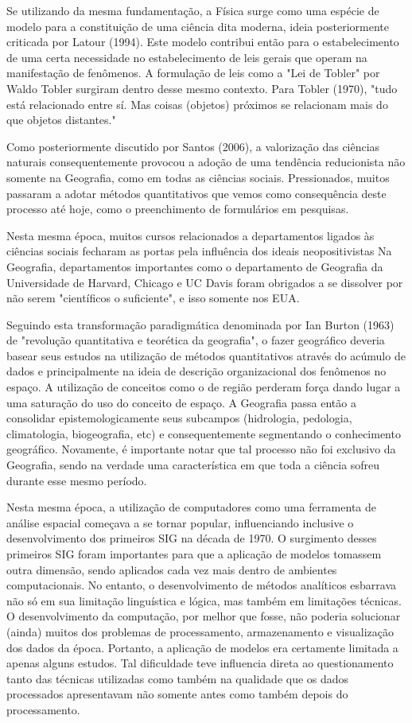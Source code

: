 Se utilizando da mesma fundamentação, a Física surge como uma espécie de modelo para a constituição de uma ciência dita moderna, ideia posteriormente criticada por Latour (1994)\cite{LATOUR}. Este modelo contribui então para o estabelecimento de uma certa necessidade no estabelecimento de leis gerais que operam na manifestação de fenômenos. A formulação de leis como a "Lei de Tobler" por Waldo Tobler surgiram dentro desse mesmo contexto. Para Tobler (1970)\cite{TOBLER}, "tudo está relacionado entre sí. Mas coisas (objetos) próximos se relacionam mais do que objetos distantes."

Como posteriormente discutido por Santos (2006)\cite{SANTOS_06}, a valorização das ciências naturais consequentemente provocou a adoção de uma tendência reducionista não somente na Geografia, como em todas as ciências sociais. Pressionados, muitos passaram a adotar métodos quantitativos que vemos como consequência deste processo até hoje, como o preenchimento de formulários em pesquisas.

Nesta mesma época, muitos cursos relacionados a departamentos ligados às ciências sociais fecharam as portas pela influência dos ideais neopositivistas Na Geografia, departamentos importantes como o departamento de Geografia da Universidade de Harvard, Chicago e UC Davis foram obrigados a se dissolver por não serem "científicos o suficiente", e isso somente nos EUA. 

Seguindo esta transformação paradigmática denominada por Ian Burton (1963)\cite{BURTON} de "revolução quantitativa e teorética da geografia", o fazer geográfico deveria basear seus estudos na utilização de métodos quantitativos através do acúmulo de dados e principalmente na ideia de descrição organizacional dos fenômenos no espaço. A utilização de conceitos como o de região perderam força dando lugar a uma saturação do uso do conceito de espaço. A Geografia passa então a consolidar epistemologicamente seus subcampos (hidrologia, pedologia, climatologia, biogeografia, etc) e consequentemente segmentando o conhecimento geográfico. Novamente, é importante notar que tal processo não foi exclusivo da Geografia, sendo na verdade uma característica em que toda a ciência sofreu durante esse mesmo período.

Nesta mesma época, a utilização de computadores como uma ferramenta de análise espacial começava a se tornar popular, influenciando inclusive o desenvolvimento dos primeiros SIG na década de 1970. O surgimento desses primeiros SIG foram importantes para que a aplicação de modelos tomassem outra dimensão, sendo aplicados cada vez mais dentro de ambientes computacionais. No entanto, o desenvolvimento de métodos analíticos esbarrava não só em sua limitação linguística e lógica, mas também em limitações técnicas. O desenvolvimento da computação, por melhor que fosse, não poderia solucionar (ainda) muitos dos problemas de processamento, armazenamento e visualização dos dados da época. Portanto, a aplicação de modelos era certamente limitada a apenas alguns estudos. Tal dificuldade teve influencia direta ao questionamento tanto das técnicas utilizadas como também na qualidade que os dados processados apresentavam não somente antes como também depois do processamento.

